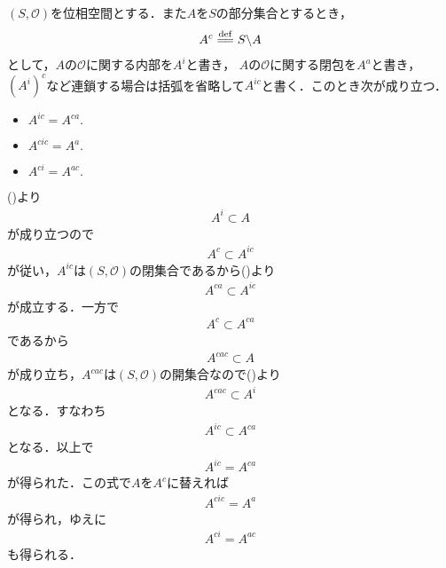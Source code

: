 	\begin{screen}
		\begin{thm}[内部の補集合は補集合の閉包]
		\label{thm:topology_note_closure_interior}
			$(S,\mathscr{O})$を位相空間とする．また$A$を$S$の部分集合とするとき，
			\begin{align}
				A^c \defeq S \backslash A
			\end{align}
			として，$A$の$\mathscr{O}$に関する内部を$A^i$と書き，
			$A$の$\mathscr{O}$に関する閉包を$A^a$と書き，
			$(A^i)^c$など連鎖する場合は括弧を省略して$A^{ic}$と書く．このとき次が成り立つ．
			\begin{itemize}
				\item $A^{ic} = A^{ca}.$
				\item $A^{cic} = A^a.$
				\item $A^{ci} = A^{ac}.$
			\end{itemize}
		\end{thm}
	\end{screen}
	
	\begin{prf}
		()より
		\begin{align}
			A^i \subset A
		\end{align}
		が成り立つので
		\begin{align}
			A^c \subset A^{ic}
		\end{align}
		が従い，$A^{ic}$は$(S,\mathscr{O})$の閉集合であるから()より
		\begin{align}
			A^{ca} \subset A^{ic} 
		\end{align}
		が成立する．一方で
		\begin{align}
			A^c \subset A^{ca}
		\end{align}
		であるから
		\begin{align}
			A^{cac} \subset A
		\end{align}
		が成り立ち，$A^{cac}$は$(S,\mathscr{O})$の開集合なので()より
		\begin{align}
			A^{cac} \subset A^i
		\end{align}
		となる．すなわち
		\begin{align}
			A^{ic} \subset A^{ca}
		\end{align}
		となる．以上で
		\begin{align}
			A^{ic} = A^{ca}
		\end{align}
		が得られた．この式で$A$を$A^c$に替えれば
		\begin{align}
			A^{cic} = A^a
		\end{align}
		が得られ，ゆえに
		\begin{align}
			A^{ci} = A^{ac}
		\end{align}
		も得られる．
		\QED
	\end{prf}
	
